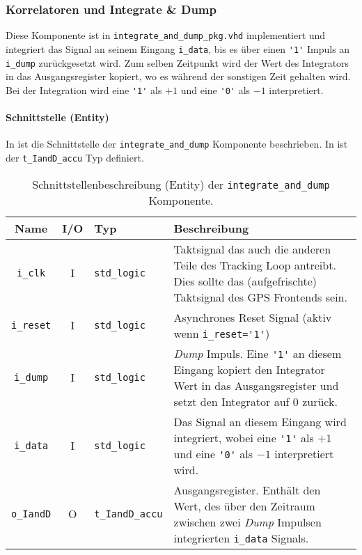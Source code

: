 \subsubsection{Korrelatoren und Integrate \& Dump}


Diese Komponente ist in \lstinline$integrate_and_dump_pkg.vhd$ implementiert und integriert das Signal an seinem Eingang \lstinline$i_data$, bis es über einen \lstinline$'1'$ Impuls an \lstinline$i_dump$ zurückgesetzt wird. Zum selben Zeitpunkt wird der Wert des Integrators in das Ausgangsregister kopiert, wo es während der sonstigen Zeit gehalten wird. Bei der Integration wird eine \lstinline$'1'$ als $+1$ und eine \lstinline$'0'$ als $-1$ interpretiert.

\paragraph{Schnittstelle (Entity)}
In  ist die Schnittstelle der \lstinline$integrate_and_dump$ Komponente beschrieben. In  ist der \lstinline$t_IandD_accu$ Typ definiert.

\begin{table}[htbp]
    \ttabbox
    {
        \caption[Integrate \& Dump Block Schnittstelle]{Schnittstellenbeschreibung (Entity) der \lstinline$integrate_and_dump$ Komponente.}
        \label{TabIandD_Entity}
    }
    {
    \begin{tabular}{c c  p{2cm} p{6cm}}
        \toprule
        Name                    & I/O	& Typ				& Beschreibung \\
        \midrule
        \lstinline$i_clk$	& I	& \lstinline$std_logic$		& Taktsignal das auch die anderen Teile des Tracking Loop antreibt. Dies sollte das (aufgefrischte) Taktsignal des GPS Frontends sein.\\
        \lstinline$i_reset$	& I	& \lstinline$std_logic$		& Asynchrones Reset Signal (aktiv wenn \lstinline$i_reset='1'$) \\
        \lstinline$i_dump$	& I	& \lstinline$std_logic$		& \emph{Dump} Impuls. Eine \lstinline$'1'$ an diesem Eingang kopiert den Integrator Wert in das Ausgangsregister und setzt den Integrator auf $0$ zurück.\\
        \lstinline$i_data$	& I	& \lstinline$std_logic$		& Das Signal an diesem Eingang wird integriert, wobei eine \lstinline$'1'$ als $+1$ und eine \lstinline$'0'$ als $-1$ interpretiert wird.\\
        \lstinline$o_IandD$	& O	& \lstinline$t_IandD_accu$	& Ausgangsregister. Enthält den Wert, des über den Zeitraum zwischen zwei \emph{Dump} Impulsen integrierten \lstinline$i_data$ Signals.\\
        \bottomrule
    \end{tabular}
}
\end{table}


